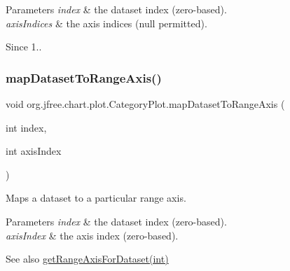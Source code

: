 \begin{DoxyParams}{Parameters}
{\em index} & the dataset index (zero-\/based). \\
\hline
{\em axis\+Indices} & the axis indices ({\ttfamily null} permitted).\\
\hline
\end{DoxyParams}
\begin{DoxySince}{Since}
1.. 
\end{DoxySince}
\mbox{\label{classorg_1_1jfree_1_1chart_1_1plot_1_1_category_plot_a99162f519931f2553fb014dd0fe174e2}} 
\subsubsection{\texorpdfstring{map\+Dataset\+To\+Range\+Axis()}{mapDatasetToRangeAxis()}}
{\footnotesize\ttfamily void org.\+jfree.\+chart.\+plot.\+Category\+Plot.\+map\+Dataset\+To\+Range\+Axis (\begin{DoxyParamCaption}\item[{int}]{index,  }\item[{int}]{axis\+Index }\end{DoxyParamCaption})}

Maps a dataset to a particular range axis.


\begin{DoxyParams}{Parameters}
{\em index} & the dataset index (zero-\/based). \\
\hline
{\em axis\+Index} & the axis index (zero-\/based).\\
\hline
\end{DoxyParams}
\begin{DoxySeeAlso}{See also}
\mbox{\hyperlink{classorg_1_1jfree_1_1chart_1_1plot_1_1_category_plot_a23f209e7a7eb1f7370c361cd78cb6d68}{get\+Range\+Axis\+For\+Dataset(int)}} 
\end{DoxySeeAlso}
\mbox{\label{classorg_1_1jfree_1_1chart_1_1plot_1_1_category_plot_a62e996586fd48d02b2344940eae20f40}} 
